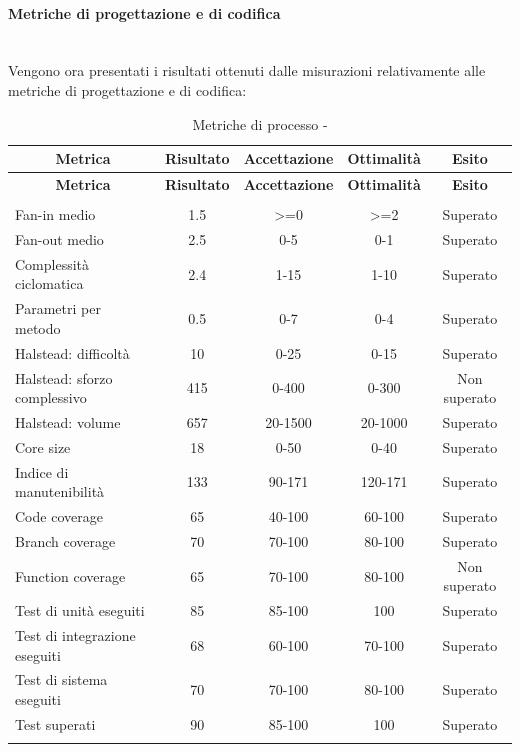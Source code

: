 \paragraph{Metriche di progettazione e di codifica}\mbox{}\\
Vengono ora presentati i risultati ottenuti dalle misurazioni relativamente alle metriche di progettazione e di codifica:
\begin{longtable}{|m{5cm}|c|c|c|c|}
	\hline \multicolumn{1}{|c|}{\textbf{Metrica}} & \multicolumn{1}{c|}{\textbf{Risultato}} & \multicolumn{1}{c|}{\textbf{Accettazione}} & \multicolumn{1}{c|}{\textbf{Ottimalità}} & \multicolumn{1}{c|}{\textbf{Esito}}\\
	\hline 
	\endfirsthead
	
	\hline \multicolumn{1}{|c|}{\textbf{Metrica}} & \multicolumn{1}{c|}{\textbf{Risultato}} & \multicolumn{1}{c|}{\textbf{Accettazione}} & \multicolumn{1}{c|}{\textbf{Ottimalità}} & \multicolumn{1}{c|}{\textbf{Esito}}\\
	\hline 
	\endhead
	
	\hline \multicolumn{5}{|r|}{\ToBeContinued} \\ 
	\hline
	\endfoot
	
	\endlastfoot
	
	\hline Fan-in medio & 1.5 & >=0 & >=2 & Superato \\
	\hline Fan-out medio & 2.5 & 0-5 & 0-1 & Superato \\
	\hline Complessità ciclomatica & 2.4 & 1-15 & 1-10 & Superato \\
	\hline Parametri per metodo & 0.5 & 0-7 & 0-4 & Superato \\
	\hline Halstead: difficoltà & 10 & 0-25 & 0-15 & Superato \\
	\hline Halstead: sforzo complessivo & 415 & 0-400 & 0-300 & Non superato\\
	\hline Halstead: volume & 657 & 20-1500 & 20-1000 & Superato \\
	\hline Core size & 18 & 0-50 & 0-40 & Superato \\
	\hline Indice di manutenibilità & 133 & 90-171 & 120-171 & Superato \\
	\hline Code coverage & 65 & 40-100 & 60-100 & Superato \\
	\hline Branch coverage & 70 & 70-100 & 80-100 & Superato \\
	\hline Function coverage & 65 & 70-100 & 80-100 & Non superato \\
	\hline Test di unità eseguiti & 85 & 85-100 & 100 & Superato \\
	\hline Test di integrazione eseguiti & 68 & 60-100 & 70-100 & Superato \\
	\hline Test di sistema eseguiti & 70 & 70-100 & 80-100 & Superato \\
	\hline Test superati & 90 & 85-100 & 100 & Superato \\
	\hline
	\caption{Metriche di processo - \RA{}}
\end{longtable}

